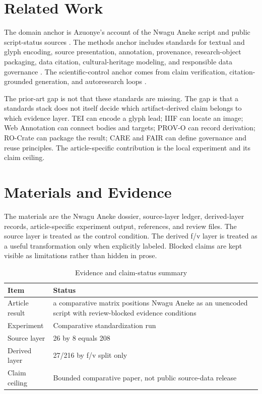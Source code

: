 \documentclass[sigconf,nonacm]{acmart}
\begin{document}
\section{Related Work}
The domain anchor is Azuonye's account of the Nwagu Aneke script and public
script-status sources \cite{azuonye1992,omniglotNwagu,unicodeAfricanScripts2023,scriptSourceNwagu,sirisNwaguProposal}.
The methods anchor includes standards for textual and glyph encoding, source
presentation, annotation, provenance, research-object packaging, data citation,
cultural-heritage modeling, and responsible data governance \cite{azuonye1992,omniglotNwagu,unicodeAfricanScripts2023,scriptSourceNwagu,sirisNwaguProposal,teiP5Glyphs,iiifPresentation3,w3cAnnotationModel,w3cAnnotationVocab,w3cProvO,rocrate12,cidocCrm,datacite45,wilkinson2016fair,carroll2020care,wadden2020scifact,gao2023alce,karpathyAutoresearch,acmSubmissions,arxivSubmitTex}.
The scientific-control anchor comes from claim verification, citation-grounded
generation, and autoresearch loops \cite{wadden2020scifact,gao2023alce,karpathyAutoresearch}.

The prior-art gap is not that these standards are missing. The gap is that a
standards stack does not itself decide which artifact-derived claim belongs to
which evidence layer. TEI can encode a glyph lead; IIIF can locate an image;
Web Annotation can connect bodies and targets; PROV-O can record derivation;
RO-Crate can package the result; CARE and FAIR can define governance and reuse
principles. The article-specific contribution is the local experiment and its
claim ceiling.

\section{Materials and Evidence}
The materials are the Nwagu Aneke dossier, source-layer ledger, derived-layer
records, article-specific experiment output, references, and review files.
The source layer is treated as the control condition. The derived f/v layer is
treated as a useful transformation only when explicitly labeled. Blocked claims
are kept visible as limitations rather than hidden in prose.


\begin{table}[t]
\caption{Evidence and claim-status summary}
\label{tab:article_na_008}
\begin{tabular}{p{}p{}}
\toprule
Item & Status \\
\midrule
Article result & a comparative matrix positions Nwagu Aneke as an unencoded script with review-blocked evidence conditions \\
Experiment & Comparative standardization run \\
Source layer & 26 by 8 equals 208 \\
Derived layer & 27/216 by f/v split only \\
Claim ceiling & Bounded comparative paper, not public source-data release \\
\bottomrule
\end{tabular}
\end{table}
\end{document}
